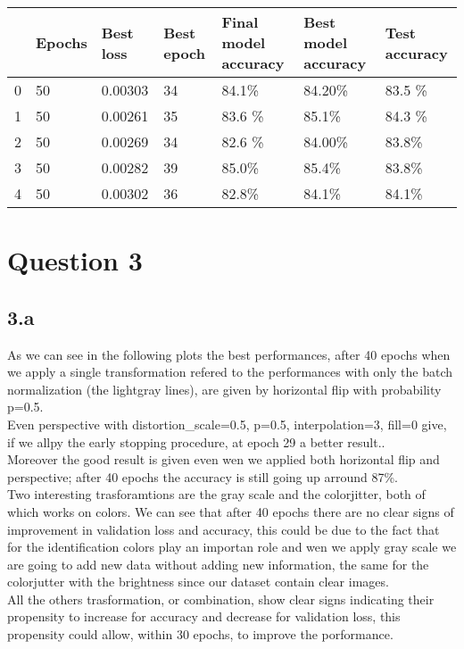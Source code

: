 \documentclass{article}
\begin{document}
\begin{tabular}{lllllll}

\toprule
{} & Epochs &              Best loss & Best epoch & Final model accuracy & Best model accuracy & Test accuracy \\
\midrule
0 &               50 &  0.00303&         34 &                84.1\% &              84.20\% &        83.5 \% \\
1 &               50 &  0.00261 &         35 &               83.6 \% &               85.1\% &        84.3 \% \\
2 &               50 &  0.00269 &         34 &               82.6 \% &              84.00\% &         83.8\% \\
3 &               50 &   0.00282 &         39 &                85.0\% &               85.4\% &         83.8\% \\
4 &               50 &  0.00302 &         36 &                82.8\% &               84.1\% &         84.1\% \\
\bottomrule

\end{tabular}








\newpage

\section{Question 3}


\subsection*{3.a}
As we can see in the following plots the best performances, after 40 epochs when we apply a single transformation refered to the performances with only the batch normalization (the lightgray lines), are given by horizontal flip with probability p=0.5.\\
Even perspective with distortion\_scale=0.5, p=0.5, interpolation=3, fill=0 give, if we allpy the early stopping procedure, at epoch 29 a better result..\\
Moreover the good result is given even wen we applied both horizontal flip and perspective; after 40 epochs the accuracy is still going up arround 87\%.\\
Two interesting trasforamtions are the gray scale and the colorjitter, both of which works on colors. We can see that after 40 epochs there are no clear signs of improvement in validation loss and accuracy, this could be due to the fact that for the identification colors play an importan role and wen we apply gray scale we are going to add new data without adding new information, the same for the colorjutter with the brightness since our dataset contain clear images.\\
All the others trasformation, or combination, show clear signs indicating their propensity to increase for accuracy and decrease for validation loss, this propensity could allow, within 30 epochs, to improve the porformance.\\
\end{document}
